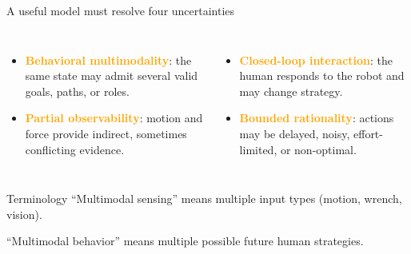 \documentclass[aspectratio=169,11pt]{beamer}
\newcommand{\key}[1]{\textcolor{orange}{\textbf{#1}}}
\begin{document}
\begin{frame}{A useful model must resolve four uncertainties}
\begin{columns}[T,onlytextwidth]
\begin{itemize}
  \item \key{Behavioral multimodality}: the same state may admit several valid goals, paths, or roles.
  \item \key{Partial observability}: motion and force provide indirect, sometimes conflicting evidence.
\end{itemize}
\begin{itemize}
  \item \key{Closed-loop interaction}: the human responds to the robot and may change strategy.
  \item \key{Bounded rationality}: actions may be delayed, noisy, effort-limited, or non-optimal.
\end{itemize}
\end{columns}
\vspace{0.35cm}
\begin{block}{Terminology}
``Multimodal sensing'' means multiple input types (motion, wrench, vision). 

``Multimodal behavior'' means multiple possible future human strategies.
\end{block}
\end{frame}
\end{document}
